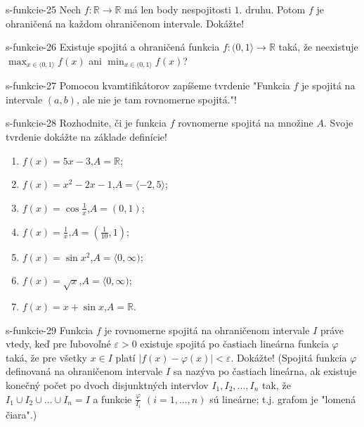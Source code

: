 	\begin{defproblem}{s-funkcie-25}
	Nech $f: \mathbb{R} \rightarrow \mathbb{R}$ má len body nespojitosti $1.$ druhu. Potom $f$ je ohraničená na každom ohraničenom intervale. Dokážte!
	\end{defproblem}
	
	\begin{defproblem}{s-funkcie-26}
	Existuje spojitá a ohraničená funkcia $f:(0,1 \rangle \rightarrow \mathbb{R}$ taká, že neexistuje $\max_{x \in (0,1 \rangle} f(x)$ ani $\min_{x \in (0,1 \rangle} f(x)$?
	\end{defproblem}
	
	\begin{defproblem}{s-funkcie-27}
	Pomocou kvamtifikátorov zapíšeme tvrdenie "Funkcia $f$ je spojitá na intervale $(a,b)$, ale nie je tam rovnomerne spojitá."!
	\end{defproblem}
	
	\begin{defproblem}{s-funkcie-28}
	Rozhodnite, či je funkcia $f$ rovnomerne spojitá na množine $A$. Svoje tvrdenie dokážte na základe definície!
	\begin{enumerate}
	\item $f(x)=5x-3$,$A=\mathbb{R}$;
	\item $f(x)=x^2-2x-1$,$A=\langle -2,5 \rangle$;
	\item $f(x)=\cos \frac{1}{x}$,$A=(0,1)$;
	\item $f(x)=\frac{1}{x}$,$A=(\frac{1}{10},1)$;
	\item $f(x)=\sin x^2$,$A=\langle 0,\infty)$;
	\item $f(x)=\sqrt{x}$,$A=\langle 0,\infty)$;
	\item $f(x)=x+\sin x$,$A=\mathbb{R}$.
	\end{enumerate}
	\end{defproblem}
	
	\begin{defproblem}{s-funkcie-29}
	Funkcia $f$ je rovnomerne spojitá na ohraničenom intervale $I$ práve vtedy, keď pre ľubovoľné $\varepsilon >0$ existuje spojitá po častiach lineárna funkcia $\varphi$ taká, že pre všetky $x \in I$ platí $|f(x)-\varphi(x)|< \varepsilon$. Dokážte! (Spojitá funkcia $\varphi$ definovaná na ohraničenom intervale $I$ sa nazýva po častiach lineárna, ak existuje konečný počet po dvoch disjunktných intervlov $I_1,I_2,...,I_n$ tak, že $I_1 \cup I_2 \cup ... \cup I_n=I$ a funkcie $\frac{\varphi}{I_i}$ $(i=1,...,n)$ sú lineárne; t.j. grafom je "lomená čiara".)
	\end{defproblem}
	
